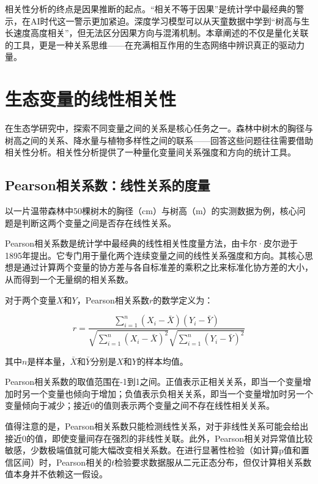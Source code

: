 \documentclass[
  twoside,12pt,fontset=none]{ctexbook}
\begin{document}
相关性分析的终点是因果推断的起点。``相关不等于因果''是统计学中最经典的警示，在AI时代这一警示更加紧迫。深度学习模型可以从天童数据中学到``树高与生长速度高度相关''，但无法区分因果方向与混淆机制。本章阐述的不仅是量化关联的工具，更是一种关系思维------在充满相互作用的生态网络中辨识真正的驱动力量。

\hypertarget{ux751fux6001ux53d8ux91cfux7684ux7ebfux6027ux76f8ux5173ux6027}{%
\section{生态变量的线性相关性}\label{ux751fux6001ux53d8ux91cfux7684ux7ebfux6027ux76f8ux5173ux6027}}

在生态学研究中，探索不同变量之间的关系是核心任务之一。森林中树木的胸径与树高之间的关系、降水量与植物多样性之间的联系------回答这些问题往往需要借助相关性分析。相关性分析提供了一种量化变量间关系强度和方向的统计工具。

\hypertarget{pearsonux76f8ux5173ux7cfbux6570ux7ebfux6027ux5173ux7cfbux7684ux5ea6ux91cf}{%
\subsection{Pearson相关系数：线性关系的度量}\label{pearsonux76f8ux5173ux7cfbux6570ux7ebfux6027ux5173ux7cfbux7684ux5ea6ux91cf}}

以一片温带森林中50棵树木的胸径（cm）与树高（m）的实测数据为例，核心问题是判断这两个变量之间是否存在线性关系。

Pearson相关系数是统计学中最经典的线性相关性度量方法，由卡尔·皮尔逊于1895年提出。它专门用于量化两个连续变量之间的线性关系强度和方向。其核心思想是通过计算两个变量的协方差与各自标准差的乘积之比来标准化协方差的大小，从而得到一个无量纲的相关系数。

对于两个变量\(X\)和\(Y\)，Pearson相关系数\(r\)的数学定义为：

\[r = \frac{\sum_{i=1}^{n}(X_i - \bar{X})(Y_i - \bar{Y})}{\sqrt{\sum_{i=1}^{n}(X_i - \bar{X})^2}\sqrt{\sum_{i=1}^{n}(Y_i - \bar{Y})^2}}\]

其中\(n\)是样本量，\(\bar{X}\)和\(\bar{Y}\)分别是\(X\)和\(Y\)的样本均值。

Pearson相关系数的取值范围在-1到1之间。正值表示正相关关系，即当一个变量增加时另一个变量也倾向于增加；负值表示负相关关系，即当一个变量增加时另一个变量倾向于减少；接近0的值则表示两个变量之间不存在线性相关关系。

值得注意的是，Pearson相关系数只能检测线性关系，对于非线性关系可能会给出接近0的值，即使变量间存在强烈的非线性关联。此外，Pearson相关对异常值比较敏感，少数极端值就可能大幅改变相关系数。在进行显著性检验（如计算p值和置信区间）时，Pearson相关的\(t\)检验要求数据服从二元正态分布，但仅计算相关系数值本身并不依赖这一假设。
\end{document}
